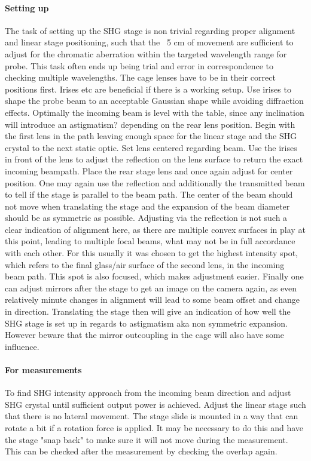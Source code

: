 \documentclass[10pt,a4paper]{article}
\begin{document}
\paragraph{Setting up}
The task of setting up the SHG stage is non trivial regarding proper alignment and linear stage positioning, such that the ~5 cm of movement are sufficient to adjust for the chromatic aberration within the targeted wavelength range for probe. This task often ends up being trial and error in correspondence to checking multiple wavelengths. The cage lenses have to be in their correct positions first.\newline
Irises etc are beneficial if there is a working setup.\newline
Use irises to shape the probe beam to an acceptable Gaussian shape while avoiding diffraction effects. Optimally the incoming beam is level with the table, since any inclination will introduce an astigmatism? depending on the rear lens position.\newline
Begin with the first lens in the path leaving enough space for the linear stage and the SHG crystal to the next static optic. Set lens centered regarding beam. Use the irises in front of the lens to adjust the reflection on the lens surface to return the exact incoming beampath.\newline
Place the rear stage lens and once again adjust for center position. One may again use the reflection and additionally the transmitted beam to tell if the stage is parallel to the beam path. The center of the beam should not move when translating the stage and the expansion of the beam diameter should be as symmetric as possible. Adjusting via the reflection is not such a clear indication of alignment here, as there are multiple convex surfaces in play at this point, leading to multiple focal beams, what may not be in full accordance with each other. For this usually it was chosen to get the highest intensity spot, which refers to the final glass/air surface of the second lens, in the incoming beam path. This spot is also focused, which makes adjustment easier.\newline
Finally one can adjust mirrors after the stage to get an image on the camera again, as even relatively minute changes in alignment will lead to some beam offset and change in direction. Translating the stage then will give an indication of how well the SHG stage is set up in regards to astigmatism aka non symmetric expansion. However beware that the mirror outcoupling in the cage will also have some influence.
\paragraph{For measurements}
To find SHG intensity approach from the incoming beam direction and adjust SHG crystal until sufficient output power is achieved.\newline
Adjust the linear stage such that there is no lateral movement. The stage slide is mounted in a way that can rotate a bit if a rotation force is applied. It may be necessary to do this and have the stage "snap back" to make sure it will not move during the measurement. This can be checked after the measurement by checking the overlap again.
\end{document}
